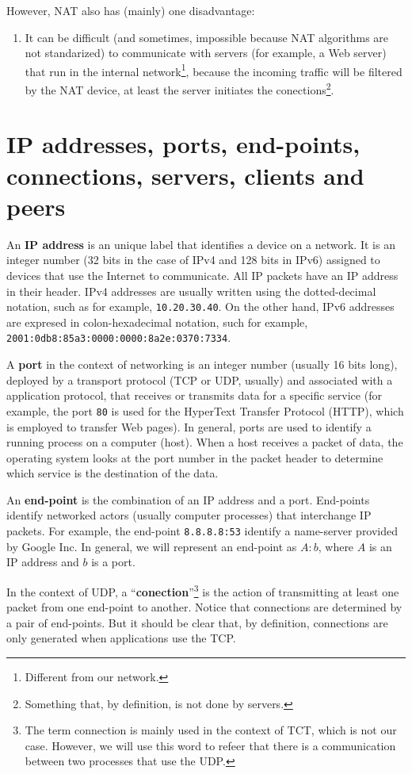 However, NAT also has (mainly) one disadvantage:
\begin{enumerate}
\item It can be difficult (and sometimes, impossible because NAT
  algorithms are not standarized) to communicate with servers (for
  example, a Web server) that run in the internal
  network\footnote{Different from our network.}, because the incoming
  traffic will be filtered by the NAT device, at least the server
  initiates the conections\footnote{Something that, by definition, is
    not done by servers.}.
\end{enumerate}

\section{IP addresses, ports, end-points, connections, servers, clients and peers}

An \textbf{IP address} is an unique label that identifies a device on a
network. It is an integer number (32 bits in the case of IPv4 and 128
bits in IPv6) assigned to devices that use the Internet to
communicate. All IP packets have an IP address in their header. IPv4
addresses are usually written using the dotted-decimal notation, such
as for example, \texttt{10.20.30.40}. On the other hand, IPv6
addresses are expresed in colon-hexadecimal notation, such for
example, \texttt{2001:0db8:85a3:0000:0000:8a2e:0370:7334}.

A \textbf{port} in the context of networking is an integer number
(usually 16 bits long), deployed by a transport protocol (TCP or UDP,
usually) and associated with a application protocol, that receives or
transmits data for a specific service (for example, the port
\texttt{80} is used for the HyperText Transfer Protocol (HTTP), which
is employed to transfer Web pages). In general, ports are used to
identify a running process on a computer (host). When a host receives
a packet of data, the operating system looks at the port number in the
packet header to determine which service is the destination of the
data.

An \textbf{end-point} is the combination of an IP address and a
port. End-points identify networked actors (usually computer
processes) that interchange IP packets. For example, the end-point
\texttt{8.8.8.8:53} identify a name-server provided by Google Inc. In
general, we will represent an end-point as $A:b$, where $A$ is an
IP address and $b$ is a port.

In the context of UDP, a ``\textbf{conection}''\footnote{The term
  connection is mainly used in the context of TCT, which is not our
  case. However, we will use this word to refeer that there is a
  communication between two processes that use the UDP.} is the action
of transmitting at least one packet from one end-point to
another. Notice that connections are determined by a pair of
end-points. But it should be clear that, by definition, connections
are only generated when applications use the TCP.

